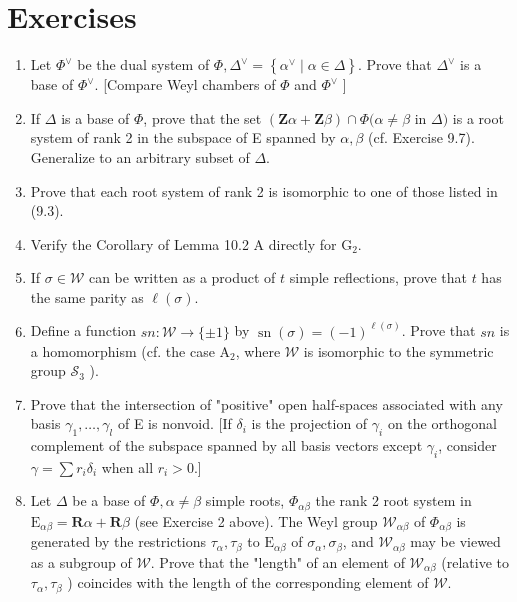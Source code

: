 \documentclass[10pt]{article}
\begin{document}
\section*{Exercises}
\begin{enumerate}
  \item Let $\Phi^{\vee}$ be the dual system of $\Phi, \Delta^{\vee}=\left\{\alpha^{\vee} \mid \alpha \in \Delta\right\}$. Prove that $\Delta^{\vee}$ is a base of $\Phi^{\vee}$. [Compare Weyl chambers of $\Phi$ and $\Phi^{\vee}$ ]
  \item If $\Delta$ is a base of $\Phi$, prove that the set $(\mathbf{Z} \alpha+\mathbf{Z} \beta) \cap \Phi(\alpha \neq \beta$ in $\Delta)$ is a root system of rank 2 in the subspace of E spanned by $\alpha, \beta$ (cf. Exercise 9.7). Generalize to an arbitrary subset of $\Delta$.
  \item Prove that each root system of rank 2 is isomorphic to one of those listed in (9.3).
  \item Verify the Corollary of Lemma 10.2 A directly for $\mathrm{G}_{2}$.
  \item If $\sigma \in \mathscr{W}$ can be written as a product of $t$ simple reflections, prove that $t$ has the same parity as $\ell(\sigma)$.
  \item Define a function $s n: \mathscr{W} \rightarrow\{ \pm 1\}$ by $\operatorname{sn}(\sigma)=(-1)^{\ell(\sigma)}$. Prove that $s n$ is a homomorphism (cf. the case $\mathrm{A}_{2}$, where $\mathscr{W}$ is isomorphic to the symmetric group $\mathscr{S}_{3}$ ).
  \item Prove that the intersection of "positive" open half-spaces associated with any basis $\gamma_{1}, \ldots, \gamma_{l}$ of E is nonvoid. [If $\delta_{i}$ is the projection of $\gamma_{i}$ on the orthogonal complement of the subspace spanned by all basis vectors except $\gamma_{i}$, consider $\gamma=\sum r_{i} \delta_{i}$ when all $r_{i}>0$.]
  \item Let $\Delta$ be a base of $\Phi, \alpha \neq \beta$ simple roots, $\Phi_{\alpha \beta}$ the rank 2 root system in $\mathrm{E}_{\alpha \beta}=\mathbf{R} \alpha+\mathbf{R} \beta$ (see Exercise 2 above). The Weyl group $\mathscr{W}_{\alpha \beta}$ of $\Phi_{\alpha \beta}$ is generated by the restrictions $\tau_{\alpha}, \tau_{\beta}$ to $\mathrm{E}_{\alpha \beta}$ of $\sigma_{\alpha}, \sigma_{\beta}$, and $\mathscr{W}_{\alpha \beta}$ may be viewed as a subgroup of $\mathscr{W}$. Prove that the "length" of an element of $\mathscr{W}_{\alpha \beta}$ (relative to $\tau_{\alpha}, \tau_{\beta}$ ) coincides with the length of the corresponding element of $\mathscr{W}$.

\end{enumerate}
\end{document}
